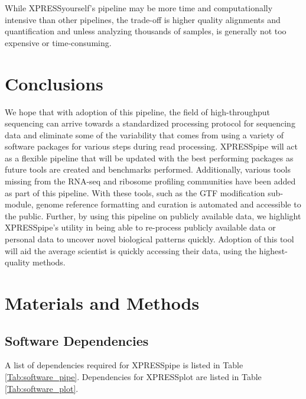 \documentclass[11pt, a4paper, oneside]{article}
\begin{document}
While XPRESSyourself's pipeline may be more time and computationally intensive than other pipelines, the trade-off is higher quality alignments and quantification and unless analyzing thousands of samples, is generally not too expensive or time-consuming.


\section{Conclusions}
 We hope that with adoption of this pipeline, the field of high-throughput sequencing can arrive towards a standardized processing protocol for sequencing data and eliminate some of the variability that comes from using a variety of software packages for various steps during read processing. XPRESSpipe will act as a flexible pipeline that will be updated with the best performing packages as future tools are created and benchmarks performed. Additionally, various tools missing from the RNA-seq and ribosome profiling communities have been added as part of this pipeline. With these tools, such as the GTF modification sub-module, genome reference formatting and curation is automated and accessible to the public. Further, by using this pipeline on publicly available data, we highlight XPRESSpipe's utility in being able to re-process publicly available data or personal data to uncover novel biological patterns quickly. Adoption of this tool will aid the average scientist is quickly accessing their data, using the highest-quality methods.


\section{Materials and Methods}

\subsection{Software Dependencies}
A list of dependencies required for XPRESSpipe is listed in Table \ref{Tab:software_pipe}. Dependencies for XPRESSplot are listed in Table \ref{Tab:software_plot}.
\end{document}
